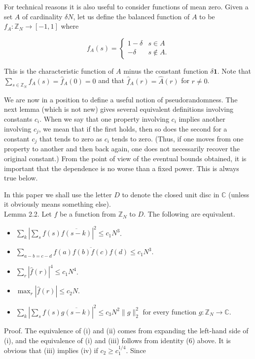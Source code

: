 \documentclass[10pt]{article}
\begin{document}
For technical reasons it is also useful to consider functions of mean zero. Given a set $A$ of cardinality $\delta N$, let us define the balanced function of $A$ to be $f_{A}: \mathbb{Z}_{N} \rightarrow[-1,1]$ where

$$
f_{A}(s)= \begin{cases}1-\delta & s \in A \\ -\delta & s \notin A .\end{cases}
$$

This is the characteristic function of $A$ minus the constant function $\delta \mathbf{1}$. Note that $\sum_{s \in \mathbb{Z}_{N}} f_{A}(s)=\hat{f}_{A}(0)=0$ and that $\hat{f}_{A}(r)=\hat{A}(r)$ for $r \neq 0$.

We are now in a position to define a useful notion of pseudorandomness. The next lemma (which is not new) gives several equivalent definitions involving constants $c_{i}$. When we say that one property involving $c_{i}$ implies another involving $c_{j}$, we mean that if the first holds, then so does the second for a constant $c_{j}$ that tends to zero as $c_{i}$ tends to zero. (Thus, if one moves from one property to another and then back again, one does not necessarily recover the original constant.) From the point of view of the eventual bounds obtained, it is important that the dependence is no worse than a fixed power. This is always true below.

In this paper we shall use the letter $D$ to denote the closed unit disc in $\mathbb{C}$ (unless it obviously means something else).\\
Lemma 2.2. Let $f$ be a function from $\mathbb{Z}_{N}$ to $D$. The following are equivalent.

\begin{itemize}
  \item[(i)] $\sum_{k}\left|\sum_{s} f(s) \overline{f(s-k)}\right|^{2} \leqslant c_{1} N^{3}$.
  \item[(ii)] $\sum_{a-b=c-d} f(a) \overline{f(b) f(c)} f(d) \leqslant c_{1} N^{3}$.
  \item[(iii)] $\sum_{r}|\hat{f}(r)|^{4} \leqslant c_{1} N^{4}$.
  \item[(iv)] $\max _{r}|\hat{f}(r)| \leqslant c_{2} N$.
  \item[(v)] $\sum_{k}\left|\sum_{s} f(s) \overline{g(s-k)}\right|^{2} \leqslant c_{3} N^{2}\|g\|_{2}^{2}$ for every function $g: \mathbb{Z}_{N} \rightarrow \mathbb{C}$.
\end{itemize}

Proof. The equivalence of (i) and (ii) comes from expanding the left-hand side of (i), and the equivalence of (i) and (iii) follows from identity (6) above. It is obvious that (iii) implies (iv) if $c_{2} \geqslant c_{1}^{1 / 4}$. Since
\end{document}
